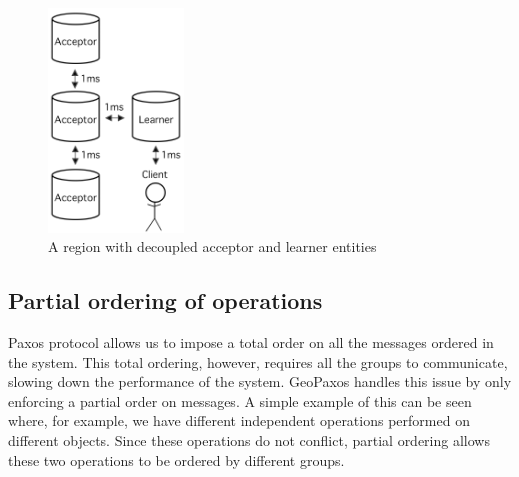 \begin{figure}[htb]
  \centering
  \includegraphics[width=0.32\textwidth,height=\textheight,keepaspectratio]{img/decoupling_good.png}
  \caption{A region with decoupled acceptor and learner entities}
  \label{fig:decoupling_good}
\end{figure}




\subsection{Partial ordering of operations}
Paxos protocol allows us to impose a total order on all the messages ordered in the system. This total ordering, however, requires all the groups to communicate, slowing down the performance of the system. GeoPaxos handles this issue by only enforcing a partial order on messages.
A simple example of this can be seen where, for example, we have different independent operations performed on different objects. Since these operations do not conflict, partial ordering allows these two operations to be ordered by different groups.

